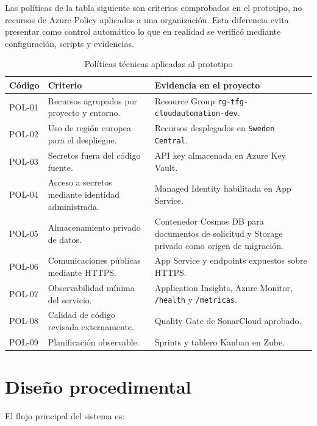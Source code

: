 Las políticas de la tabla siguiente son criterios comprobados en el prototipo, no recursos de Azure Policy aplicados a una organización. Esta diferencia evita presentar como control automático lo que en realidad se verificó mediante configuración, scripts y evidencias.

\begin{table}[h]
\centering
\small
\begin{tabularx}{\textwidth}{l X X}
\textbf{Código} & \textbf{Criterio} & \textbf{Evidencia en el proyecto} \\
\hline
POL-01 & Recursos agrupados por proyecto y entorno. & Resource Group \texttt{rg-tfg-cloudautomation-dev}. \\
POL-02 & Uso de región europea para el despliegue. & Recursos desplegados en \texttt{Sweden Central}. \\
POL-03 & Secretos fuera del código fuente. & API key almacenada en Azure Key Vault. \\
POL-04 & Acceso a secretos mediante identidad administrada. & Managed Identity habilitada en App Service. \\
POL-05 & Almacenamiento privado de datos. & Contenedor Cosmos DB para documentos de solicitud y Storage privado como origen de migración. \\
POL-06 & Comunicaciones públicas mediante HTTPS. & App Service y endpoints expuestos sobre HTTPS. \\
POL-07 & Observabilidad mínima del servicio. & Application Insights, Azure Monitor, \texttt{/health} y \texttt{/metricas}. \\
POL-08 & Calidad de código revisada externamente. & Quality Gate de SonarCloud aprobado. \\
POL-09 & Planificación observable. & Sprints y tablero Kanban en Zube. \\
\end{tabularx}
\caption{Políticas técnicas aplicadas al prototipo}
\label{tabla:politicas_tecnicas}
\end{table}
\section{Diseño procedimental}

El flujo principal del sistema es:

